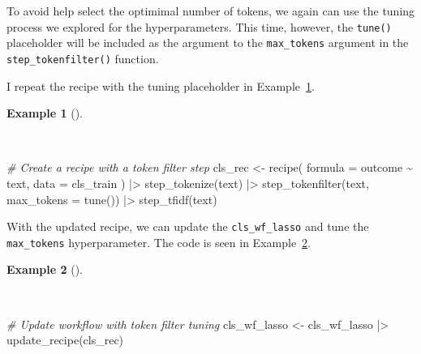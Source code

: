 \documentclass[
  letterpaper,
]{latex/krantz}
\newenvironment{Shaded}{\begin{snugshade}}{\end{snugshade}}
\newcommand{\AttributeTok}[1]{\textcolor[rgb]{0.00,0.00,0.00}{#1}}
\newcommand{\CommentTok}[1]{\textcolor[rgb]{0.00,0.00,0.00}{\textit{#1}}}
\newcommand{\FunctionTok}[1]{\textcolor[rgb]{0.00,0.00,0.00}{#1}}
\newcommand{\NormalTok}[1]{\textcolor[rgb]{0.00,0.00,0.00}{#1}}
\newcommand{\OtherTok}[1]{\textcolor[rgb]{0.00,0.00,0.00}{#1}}
\newcommand{\SpecialCharTok}[1]{\textcolor[rgb]{0.00,0.00,0.00}{#1}}
\theoremstyle{definition}
\newtheorem{example}{Example}[chapter]
\theoremstyle{remark}
\begin{document}
To avoid help select the optimimal number of tokens, we again can use
the tuning process we explored for the hyperparameters. This time,
however, the \texttt{tune()} placeholder will be included as the
argument to the \texttt{max\_tokens} argument in the
\texttt{step\_tokenfilter()} function.

I repeat the recipe with the tuning placeholder in
Example~\ref{exm-predict-class-tune-hyperparameters-tokenfilter}.

\begin{example}[]\protect\hypertarget{exm-predict-class-tune-hyperparameters-tokenfilter}{}\label{exm-predict-class-tune-hyperparameters-tokenfilter}

~

\begin{Shaded}
\begin{Highlighting}[]
\CommentTok{\# Create a recipe with a token filter step}
\NormalTok{cls\_rec }\OtherTok{\textless{}{-}}
  \FunctionTok{recipe}\NormalTok{(}
    \AttributeTok{formula =}\NormalTok{ outcome }\SpecialCharTok{\textasciitilde{}}\NormalTok{ text,}
    \AttributeTok{data =}\NormalTok{ cls\_train}
\NormalTok{    ) }\SpecialCharTok{|\textgreater{}}
  \FunctionTok{step\_tokenize}\NormalTok{(text) }\SpecialCharTok{|\textgreater{}}
  \FunctionTok{step\_tokenfilter}\NormalTok{(text, }\AttributeTok{max\_tokens =} \FunctionTok{tune}\NormalTok{()) }\SpecialCharTok{|\textgreater{}}
  \FunctionTok{step\_tfidf}\NormalTok{(text)}
\end{Highlighting}
\end{Shaded}

\end{example}

With the updated recipe, we can update the \texttt{cls\_wf\_lasso} and
tune the \texttt{max\_tokens} hyperparameter. The code is seen in
Example~\ref{exm-predict-class-tune-hyperparameters-update-rec}.

\begin{example}[]\protect\hypertarget{exm-predict-class-tune-hyperparameters-update-rec}{}\label{exm-predict-class-tune-hyperparameters-update-rec}

~

\begin{Shaded}
\begin{Highlighting}[]
\CommentTok{\# Update workflow with token filter tuning}
\NormalTok{cls\_wf\_lasso }\OtherTok{\textless{}{-}}
\NormalTok{  cls\_wf\_lasso }\SpecialCharTok{|\textgreater{}}
  \FunctionTok{update\_recipe}\NormalTok{(cls\_rec)}
\end{Highlighting}
\end{Shaded}

\end{example}
\end{document}
